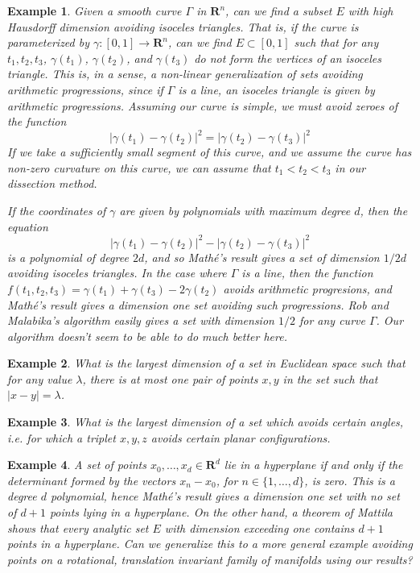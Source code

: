 \documentclass{report}
\theoremstyle{plain}
\newtheorem*{example}{Example}
\theoremstyle{plain}
\begin{document}
\begin{example}
Given a smooth curve $\Gamma$ in $\mathbf{R}^n$, can we find a subset $E$ with high Hausdorff dimension avoiding isoceles triangles. That is, if the curve is parameterized by $\gamma: [0,1] \to \mathbf{R}^n$, can we find $E \subset [0,1]$ such that for any $t_1, t_2, t_3$, $\gamma(t_1)$, $\gamma(t_2)$, and $\gamma(t_3)$ do not form the vertices of an isoceles triangle. This is, in a sense, a non-linear generalization of sets avoiding arithmetic progressions, since if $\Gamma$ is a line, an isoceles triangle is given by arithmetic progressions. Assuming our curve is simple, we must avoid zeroes of the function
%
\[ |\gamma(t_1) - \gamma(t_2)|^2 = |\gamma(t_2) - \gamma(t_3)|^2 \]
%
If we take a sufficiently small segment of this curve, and we assume the curve has non-zero curvature on this curve, we can assume that $t_1 < t_2 < t_3$ in our dissection method.

If the coordinates of $\gamma$ are given by polynomials with maximum degree $d$, then the equation
%
\[ |\gamma(t_1) - \gamma(t_2)|^2 - |\gamma(t_2) - \gamma(t_3)|^2 \]
%
is a polynomial of degree $2d$, and so Math\'{e}'s result gives a set of dimension $1/2d$ avoiding isoceles triangles. In the case where $\Gamma$ is a line, then the function $f(t_1,t_2,t_3) = \gamma(t_1) + \gamma(t_3) - 2\gamma(t_2)$ avoids arithmetic progresions, and Math\'{e}'s result gives a dimension one set avoiding such progressions. Rob and Malabika's algorithm easily gives a set with dimension $1/2$ for any curve $\Gamma$. Our algorithm doesn't seem to be able to do much better here.
\end{example}

\begin{example}
    What is the largest dimension of a set in Euclidean space such that for any value $\lambda$, there is at most one pair of points $x,y$ in the set such that $|x - y| = \lambda$.
\end{example}

\begin{example}
    What is the largest dimension of a set which avoids certain angles, i.e. for which a triplet $x,y,z$ avoids certain planar configurations.
\end{example}

\begin{example}
    A set of points $x_0, \dots, x_d \in \mathbf{R}^d$ lie in a hyperplane if and only if the determinant formed by the vectors $x_n - x_0$, for $n \in \{ 1, \dots, d \}$, is zero. This is a degree $d$ polynomial, hence Math\'{e}'s result gives a dimension one set with no set of $d+1$ points lying in a hyperplane. On the other hand, a theorem of Mattila shows that every analytic set $E$ with dimension exceeding one contains $d + 1$ points in a hyperplane. Can we generalize this to a more general example avoiding points on a rotational, translation invariant family of manifolds using our results?
\end{example}
\end{document}
